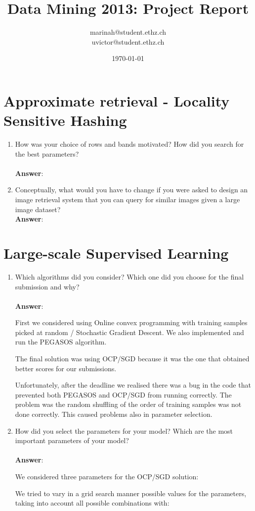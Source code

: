 \documentclass[11pt]{article}
\title{Data Mining 2013: Project Report}
\author{marinah@student.ethz.ch\\ uvictor@student.ethz.ch\\}
\date{\today}
\begin{document}
\maketitle

\section{Approximate retrieval - Locality Sensitive Hashing}
\begin{enumerate}
\item How was your choice of rows and bands motivated? How did you search for the
best parameters? \\ \\
\textbf{Answer}:

\item Conceptually, what would you have to change if you were asked to design an image
  retrieval system that you can query for similar images given a large image
  dataset? \\

\textbf{Answer}:

\end{enumerate}

\section{Large-scale Supervised Learning}

\begin{enumerate}
\item Which algorithms did you consider? Which one did you choose for the
  final submission and why? \\ \\
\textbf{Answer}:

First we considered using Online convex programming with training samples picked at random / Stochastic Gradient Descent. We also implemented and run
the PEGASOS algorithm. 

The final solution was using OCP/SGD because it was the one that obtained better scores for our submissions. 

Unfortunately, after the deadline we realised there was a bug in the code that prevented both PEGASOS and OCP/SGD from running correctly. The problem
was the random shuffling of the order of training samples was not done correctly. This caused problems also in parameter selection.

\item How did you select the parameters for your model? Which are the
  most important parameters of your model? \\ \\
\textbf{Answer}:

We considered three parameters for the OCP/SGD solution:

We tried to vary in a grid search manner possible values for the parameters, taking into account all possible combinations with:
\end{enumerate}
\end{document}
